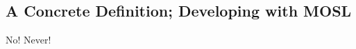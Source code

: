 \newpage
\texHeader
\subsection[A Concrete Defintion (Textual)]{A Concrete Definition; Developing with MOSL}

\hypertarget{static tex}{No! Never!}